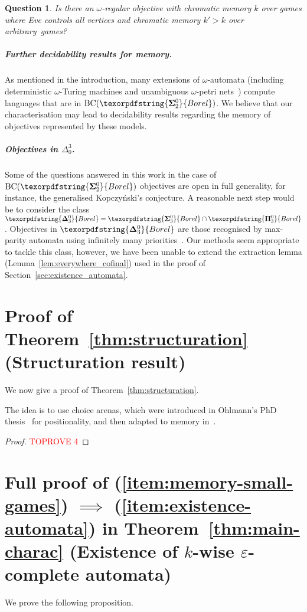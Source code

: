 \documentclass[a4paper,UKenglish,cleveref, thm-restate]{lipics-v2021}
\newtheorem{question}{Question}
\newcommand{\eps}{\varepsilon}
\newcommand{\boldclass}[3]{\texorpdfstring{\ensuremath{\mathbf{#1}^{#2}_{#3}}}{Borel}}
\newcommand{\bsigma}[1]{\boldclass{\Sigma}{0}{#1}}
\newcommand{\bpi}[1]{\boldclass{\Pi}{0}{#1}}
\newcommand{\bdelta}[1]{\boldclass{\Delta}{0}{#1}}
\newcommand{\BCSigma}{\mathrm{BC}(\boldclass{\Sigma}{0}{2})}
\newcommand{\oo}{\omega}
\begin{document}
\begin{question}
	Is there an $\oo$-regular objective  with chromatic memory $k$ over games where Eve controls all vertices and chromatic memory $k'>k$ over arbitrary~games?
\end{question}


\subparagraph*{Further decidability results for memory.} As mentioned in the introduction, many extensions of $\oo$-automata (including deterministic $\oo$-Turing machines and unambiguous $\oo$-petri nets~\cite{FSJLS22}) compute languages that are in $\BCSigma$.
We believe that our characterisation may lead to decidability results regarding the memory of objectives represented by these models.

\subparagraph*{Objectives in $\Delta_0^3$.} Some of the questions answered in this work in the case of $\BCSigma$ objectives are open in full generality, for instance, the generalised Kopczy\'nski's conjecture. A reasonable next step would be to consider the class $\bdelta 3 = \bsigma 3 \cap \bpi 3$.
Objectives in $\bdelta 3$ are those recognised by max-parity automata using infinitely many priorities~\cite{Skrzypczak13Colorings}.
Our methods seem appropriate to tackle this class, however, we have been unable to extend the extraction lemma (Lemma~\ref{lem:everywhere_cofinal}) used in the proof of Section~\ref{sec:existence_automata}.



 




\newpage
\appendix


\section{Proof of Theorem~\ref{thm:structuration} (Structuration result)}\label{app:structuration}

We now give a proof of Theorem~\ref{thm:structuration}.

\structuration*

The idea is to use choice arenas, which were introduced in Ohlmann's PhD thesis~\cite[Section 3.2 in Chapter 3]{Ohlmann21PhD} for positionality, and then adapted to memory in~\cite{CO24Positional}.

\begin{proof}\textcolor{red}{TOPROVE 4}\end{proof} 

\section{Full proof of (\ref{item:memory-small-games}) $\implies$ (\ref{item:existence-automata}) in Theorem~\ref{thm:main-charac} (Existence of $k$-wise $\eps$-complete automata)}\label{app:existence-eps-automata}
We prove the following proposition.
\end{document}
